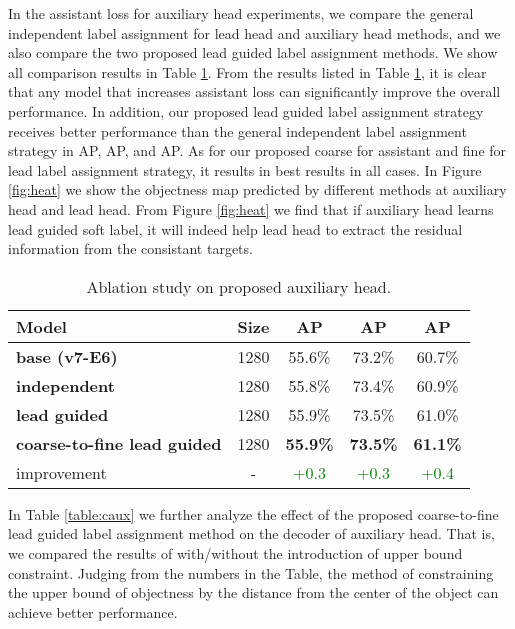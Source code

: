 \documentclass[10pt,twocolumn,letterpaper]{article}
\begin{document}
		In the assistant loss for auxiliary head experiments, we compare the general independent label assignment for lead head and auxiliary head methods, and we also compare the two proposed lead guided label assignment methods. We show all comparison results in Table \ref{table:aux}. From the results listed in Table \ref{table:aux}, it is clear that any model that increases assistant loss can significantly improve the overall performance. In addition, our proposed lead guided label assignment strategy receives better performance than the general independent label assignment strategy in AP, AP, and AP. As for our proposed coarse for assistant and fine for lead label assignment strategy, it results in best results in all cases. In Figure \ref{fig:heat} we show the objectness map predicted by different methods at auxiliary head and lead head. From Figure \ref{fig:heat} we find that if auxiliary head learns lead guided soft label, it will indeed help lead head to extract the residual information from the consistant targets.
		
		\begin{table}[h]
			\centering
			\begin{threeparttable}[h]
				\footnotesize
				\caption{Ablation study on proposed auxiliary head.}
				\label{table:aux}
				\setlength\tabcolsep{5.0pt}
				\begin{tabular}{lcccc}
					\toprule
					\textbf{Model} & \textbf{Size} & \textbf{AP} & \textbf{AP} & \textbf{AP} \\	
					\midrule
					\textbf{base (v7-E6)} & 1280 & 55.6\% & 73.2\% & 60.7\% \\
					\textbf{independent} & 1280 & 55.8\% & 73.4\% & 60.9\%\\
					\textbf{lead guided} & 1280 & 55.9\% & 73.5\% & 61.0\%\\
					\textbf{coarse-to-fine lead guided} & 1280 & \textbf{55.9\%} & \textbf{73.5\%} & \textbf{61.1\%}\\
					improvement & - & \textcolor{green}{+0.3} & \textcolor{green}{+0.3} & \textcolor{green}{+0.4} \\
					\bottomrule
				\end{tabular}
\end{threeparttable}
		\end{table}
		
		In Table \ref{table:caux} we further analyze the effect of the proposed coarse-to-fine lead guided label assignment method on the decoder of auxiliary head. That is, we compared the results of with/without the introduction of upper bound constraint. Judging from the numbers in the Table, the method of constraining the upper bound of objectness by the distance from the center of the object can achieve better performance.
		
\end{document}
